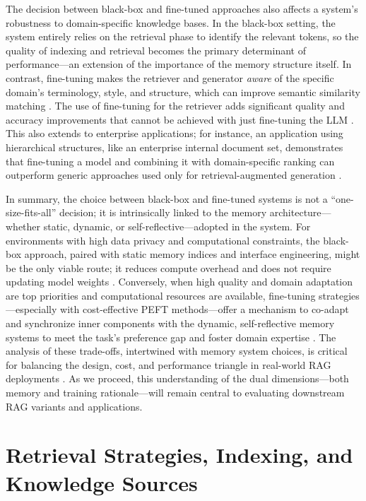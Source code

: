 \documentclass[11pt]{article}
\begin{document}
The decision between black-box and fine-tuned approaches also affects a system's robustness to domain-specific knowledge bases. In the black-box setting, the system entirely relies on the retrieval phase to identify the relevant tokens, so the quality of indexing and retrieval becomes the primary determinant of performance---an extension of the importance of the memory structure itself. In contrast, fine-tuning makes the retriever and generator \emph{aware} of the specific domain's terminology, style, and structure, which can improve semantic similarity matching \cite{ref29,ref73}. The use of fine-tuning for the retriever adds significant quality and accuracy improvements that cannot be achieved with just fine-tuning the LLM \cite{ref71}. This also extends to enterprise applications; for instance, an application using hierarchical structures, like an enterprise internal document set, demonstrates that fine-tuning a model and combining it with domain-specific ranking can outperform generic approaches used only for retrieval-augmented generation \cite{ref68}.

In summary, the choice between black-box and fine-tuned systems is not a ``one-size-fits-all'' decision; it is intrinsically linked to the memory architecture---whether static, dynamic, or self-reflective---adopted in the system. For environments with high data privacy and computational constraints, the black-box approach, paired with static memory indices and interface engineering, might be the only viable route; it reduces compute overhead and does not require updating model weights \cite{ref66,ref57}. Conversely, when high quality and domain adaptation are top priorities and computational resources are available, fine-tuning strategies---especially with cost-effective PEFT methods---offer a mechanism to co-adapt and synchronize inner components with the dynamic, self-reflective memory systems to meet the task's preference gap and foster domain expertise \cite{ref55,ref68}. The analysis of these trade-offs, intertwined with memory system choices, is critical for balancing the design, cost, and performance triangle in real-world RAG deployments \cite{ref72}. As we proceed, this understanding of the dual dimensions---both memory and training rationale---will remain central to evaluating downstream RAG variants and applications.

\section{Retrieval Strategies, Indexing, and Knowledge Sources}
\end{document}
